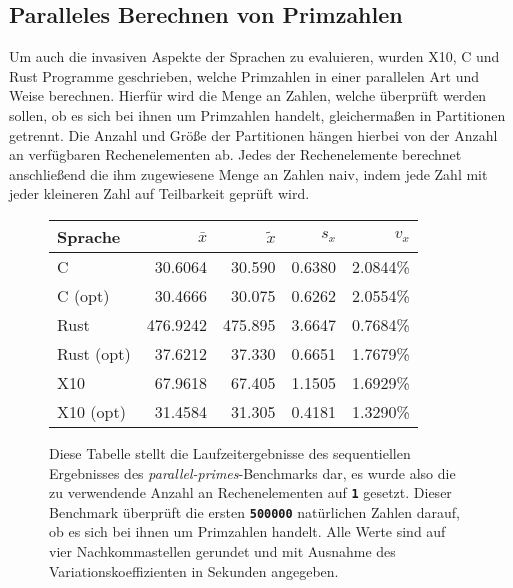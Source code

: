 \FloatBarrier

\subsection{Paralleles Berechnen von Primzahlen}

Um auch die invasiven Aspekte der Sprachen zu evaluieren, wurden X10, C und Rust Programme geschrieben,
welche Primzahlen in einer parallelen Art und Weise berechnen.
Hierfür wird die Menge an Zahlen, welche überprüft werden sollen,
ob es sich bei ihnen um Primzahlen handelt, gleichermaßen in Partitionen getrennt.
Die Anzahl und Größe der Partitionen hängen hierbei von der Anzahl an verfügbaren Rechenelementen ab.
Jedes der Rechenelemente berechnet anschließend die ihm zugewiesene Menge an Zahlen naiv,
indem jede Zahl mit jeder kleineren Zahl auf Teilbarkeit geprüft wird.

\begin{figure}[hb]
	\begin{center}
		\begin{tabular}{lrrrr}
			\toprule
			Sprache & $\bar{x}$ & $\tilde{x}$ & $s_x$ & $v_x$ \\
			\midrule
			C          &  30.6064 &  30.590 & 0.6380 & 2.0844\% \\
			C (opt)    &  30.4666 &  30.075 & 0.6262 & 2.0554\% \\
			Rust       & 476.9242 & 475.895 & 3.6647 & 0.7684\% \\
			Rust (opt) &  37.6212 &  37.330 & 0.6651 & 1.7679\% \\
			X10        &  67.9618 &  67.405 & 1.1505 & 1.6929\% \\
			X10 (opt)  &  31.4584 &  31.305 & 0.4181 & 1.3290\% \\
			\bottomrule
		\end{tabular}
	\end{center}
	\caption{
		Diese Tabelle stellt die Laufzeitergebnisse des sequentiellen Ergebnisses des
		\textit{parallel-primes}-Benchmarks dar,
		es wurde also die zu verwendende Anzahl an Rechenelementen auf \texttt{\textsc{\textbf{1}}} gesetzt.
		Dieser Benchmark überprüft die ersten \texttt{\textsc{\textbf{500000}}} natürlichen Zahlen darauf,
		ob es sich bei ihnen um Primzahlen handelt.
		Alle Werte sind auf vier Nachkommastellen gerundet und mit Ausnahme des Variationskoeffizienten
		in Sekunden angegeben.
	}
	\label{fig:primes_parallel_one_table}
\end{figure}

